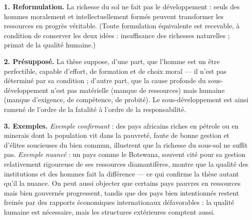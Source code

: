 \documentclass[11pt]{article}
\begin{document}
\begin{corrige}

\textbf{1. Reformulation.} \guillemotleft La richesse du sol ne fait pas le développement : seuls des hommes moralement et intellectuellement formés peuvent transformer les ressources en progrès véritable. \guillemotright (Toute formulation équivalente est recevable, à condition de conserver les deux idées : insuffisance des richesses naturelles ; primat de la qualité humaine.)

\textbf{2. Présupposé.} La thèse suppose, d'une part, que l'homme est un être perfectible, capable d'effort, de formation et de choix moral — il n'est pas déterminé par sa condition ; d'autre part, que la cause profonde du sous-développement n'est pas matérielle (manque de ressources) mais humaine (manque d'exigence, de compétence, de probité). Le sous-développement est ainsi ramené de l'ordre de la fatalité à l'ordre de la responsabilité.

\textbf{3. Exemples.} \emph{Exemple confirmant} : des pays africains riches en pétrole ou en minerais dont la population vit dans la pauvreté, faute de bonne gestion et d'élites soucieuses du bien commun, illustrent que la richesse du sous-sol ne suffit pas. \emph{Exemple nuancé} : un pays comme le Botswana, souvent cité pour sa gestion relativement rigoureuse de ses ressources diamantifères, montre que la qualité des institutions et des hommes fait la différence — ce qui confirme la thèse autant qu'il la nuance. On peut aussi objecter que certains pays pauvres en ressources mais bien gouvernés progressent, tandis que des pays bien intentionnés restent freinés par des rapports économiques internationaux défavorables : la qualité humaine est nécessaire, mais les structures extérieures comptent aussi.
\end{corrige}
\end{document}
